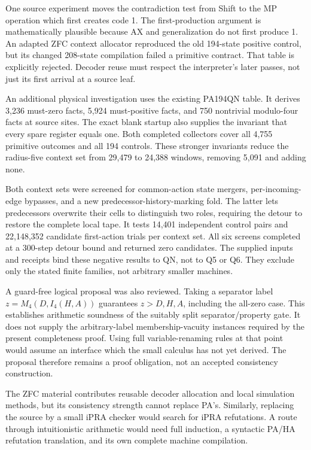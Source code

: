 \documentclass[11pt,letterpaper]{article}
\begin{document}
One source experiment moves the contradiction test from Shift to the MP
operation which first creates code 1. The first-production argument is
mathematically plausible because AX and generalization do not first
produce 1. An adapted ZFC context allocator reproduced the old 194-state
positive control, but its changed 208-state compilation failed a primitive
contract. That table is explicitly rejected. Decoder reuse must respect
the interpreter's later passes, not just its first arrival at a source
leaf.

An additional physical investigation uses the existing PA194QN table.
It derives 3,236 must-zero facts, 5,924 must-positive facts, and 750
nontrivial modulo-four facts at source sites. The exact blank startup
also supplies the invariant that every spare register equals one.
Both completed collectors cover all 4,755 primitive outcomes and all
194 controls. These stronger invariants reduce the radius-five context
set from 29,479 to 24,388 windows, removing 5,091 and adding none.

Both context sets were screened for common-action state mergers,
per-incoming-edge bypasses, and a new predecessor-history-marking fold.
The latter lets predecessors overwrite their cells to distinguish two
roles, requiring the detour to restore the complete local tape. It tests
14,401 independent control pairs and 22,148,352 candidate first-action
trials per context set. All six screens completed at a 300-step detour
bound and returned zero candidates. The supplied inputs and receipts
bind these negative results to QN, not to Q5 or Q6. They exclude only
the stated finite families, not arbitrary smaller machines.

A guard-free logical proposal was also reviewed. Taking a separator
label $z=M_4(D,I_4(H,A))$ guarantees $z>D,H,A$, including the all-zero
case. This establishes arithmetic soundness of the suitably split
separator/property gate. It does not supply the arbitrary-label
membership-vacuity instances required by the present completeness proof.
Using full variable-renaming rules at that point would assume an
interface which the small calculus has not yet derived. The proposal
therefore remains a proof obligation, not an accepted consistency
construction.

The ZFC material contributes reusable decoder allocation and local
simulation methods, but its consistency strength cannot replace PA's.
Similarly, replacing the source by a small iPRA checker would search for
iPRA refutations. A route through intuitionistic arithmetic would need
full induction, a syntactic PA/HA refutation translation, and its own
complete machine compilation.
\end{document}
